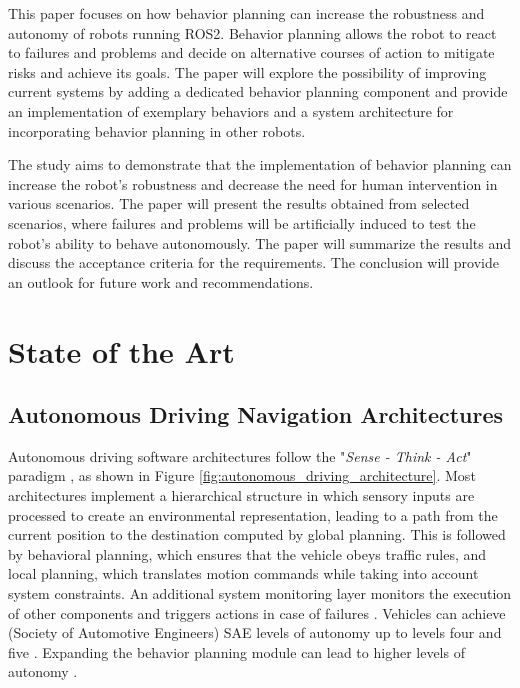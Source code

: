 \documentclass[letterpaper, 10pt, conference]{ieeeconf}
\begin{document}
This paper focuses on how behavior planning can increase the robustness and autonomy of robots running ROS2. Behavior planning allows the robot to react to failures and problems and decide on alternative courses of action to mitigate risks and achieve its goals. The paper will explore the possibility of improving current systems by adding a dedicated behavior planning component and provide an implementation of exemplary behaviors and a system architecture for incorporating behavior planning in other robots.

The study aims to demonstrate that the implementation of behavior planning can increase the robot's robustness and decrease the need for human intervention in various scenarios. The paper will present the results obtained from selected scenarios, where failures and problems will be artificially induced to test the robot's ability to behave autonomously. The paper will summarize the results and discuss the acceptance criteria for the requirements. The conclusion will provide an outlook for future work and recommendations.


\section{State of the Art}
\label{sec:StateOfTheArt}

\subsection{Autonomous Driving Navigation Architectures}

Autonomous driving software architectures follow the "\textit{Sense - Think - Act}" paradigm \cite{murphy2000}, as shown in Figure \ref{fig:autonomous_driving_architecture}. Most architectures implement a hierarchical structure in which sensory inputs are processed to create an environmental representation, leading to a path from the current position to the destination computed by global planning. This is followed by behavioral planning, which ensures that the vehicle obeys traffic rules, and local planning, which translates motion commands while taking into account system constraints. An additional system monitoring layer monitors the execution of other components and triggers actions in case of failures \cite{zimmermann2020adaptive}. Vehicles can achieve (Society of Automotive Engineers) SAE levels of autonomy up to levels four and five \cite{bacha2008odin}. Expanding the behavior planning module can lead to higher levels of autonomy \cite{reke2020}.
\end{document}
